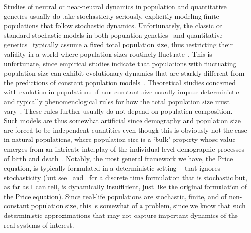 Studies of neutral or near-neutral dynamics in population and quantitative genetics usually do take stochasticity seriously, explicitly modeling finite populations that follow stochastic dynamics. Unfortunately, the classic or standard stochastic models in both population genetics~\citep{fisher_genetical_1930,wright_evolution_1931, moran_random_1958, kimura_diffusion_1964} and quantitative genetics~\citep{crow_introduction_1970, lande_natural_1976} typically assume a fixed total population size, thus restricting their validity in a world where population sizes routinely fluctuate~\citep{lambert_population_2010}. This is unfortunate, since empirical studies indicate that populations with fluctuating population size can exhibit evolutionary dynamics that are starkly different from the predictions of constant population models~\citep{sanchez_feedback_2013,chavhan_larger_2019,chavhan_interplay_2021}. Theoretical studies concerned with evolution in populations of non-constant size usually impose deterministic and typically phenomenological rules for how the total population size must vary~\citep{kimura_probability_1974,ewens_probability_1967,otto_probability_1997, engen_fixation_2009, waxman_unified_2011}. These rules further usually do not depend on population composition. Such models are thus somewhat artificial since demography and population size are forced to be independent quantities even though this is obviously not the case in natural populations, where population size is a `bulk' property whose value emerges from an intricate interplay of the individual-level demographic processes of birth and death~\citep{metcalf_why_2007,lambert_population_2010, geritz_mathematical_2012,doebeli_towards_2017}. Notably, the most general framework we have, the Price equation, is typically formulated in a deterministic setting ~\citep{page_unifying_2002,frank_natural_2012,queller_fundamental_2017,lion_theoretical_2018,day_price_2020} that ignores stochasticity (but see~\citet{rice_stochastic_2008} and~\citet{rice_universal_2020} for a discrete time formulation that is stochastic but, as far as I can tell, is dynamically insufficient, just like the original formulation of the Price equation). Since real-life populations are stochastic, finite, and of non-constant population size, this is somewhat of a problem, since we know that such deterministic approximations that may not capture important dynamics of the real systems of interest.

